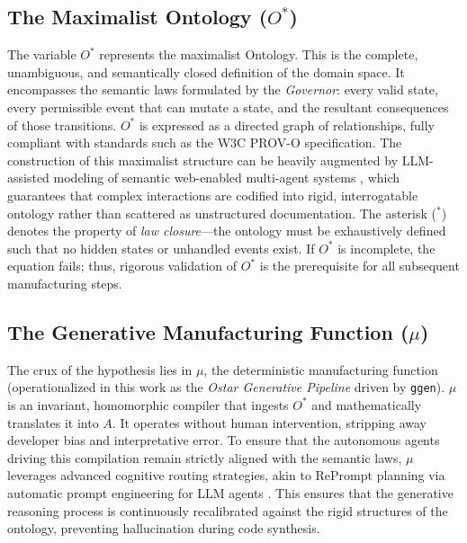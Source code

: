 \subsection{The Maximalist Ontology ($O^*$)}
The variable $O^*$ represents the maximalist Ontology. This is the complete, unambiguous, and semantically closed definition of the domain space. It encompasses the semantic laws formulated by the \textit{Governor}: every valid state, every permissible event that can mutate a state, and the resultant consequences of those transitions. $O^*$ is expressed as a directed graph of relationships, fully compliant with standards such as the W3C PROV-O specification. The construction of this maximalist structure can be heavily augmented by LLM-assisted modeling of semantic web-enabled multi-agent systems \cite{ref_LLMAssistedMode1}, which guarantees that complex interactions are codified into rigid, interrogatable ontology rather than scattered as unstructured documentation. The asterisk ($^*$) denotes the property of \textit{law closure}—the ontology must be exhaustively defined such that no hidden states or unhandled events exist. If $O^*$ is incomplete, the equation fails; thus, rigorous validation of $O^*$ is the prerequisite for all subsequent manufacturing steps.

\subsection{The Generative Manufacturing Function ($\mu$)}
The crux of the hypothesis lies in $\mu$, the deterministic manufacturing function (operationalized in this work as the \textit{Ostar Generative Pipeline} driven by \texttt{ggen}). $\mu$ is an invariant, homomorphic compiler that ingests $O^*$ and mathematically translates it into $A$. It operates without human intervention, stripping away developer bias and interpretative error. To ensure that the autonomous agents driving this compilation remain strictly aligned with the semantic laws, $\mu$ leverages advanced cognitive routing strategies, akin to RePrompt planning via automatic prompt engineering for LLM agents \cite{ref_RePromptPlannin2}. This ensures that the generative reasoning process is continuously recalibrated against the rigid structures of the ontology, preventing hallucination during code synthesis.


